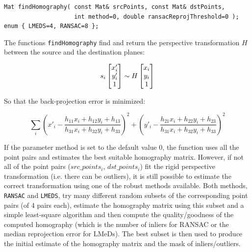 \begin{description}
\begin{lstlisting}
Mat findHomography( const Mat& srcPoints, const Mat& dstPoints,
                    int method=0, double ransacReprojThreshold=0 );
enum { LMEDS=4, RANSAC=8 };
\end{lstlisting}
\begin{description}
\end{description}

The functions \texttt{findHomography} find and return the perspective transformation $H$ between the source and the destination planes:

\[
s_i \begin{bmatrix} x'_i\\ y'_i\\ 1 \end{bmatrix} \sim H \begin{bmatrix} x_i\\ y_i\\ 1 \end{bmatrix}
\]

So that the back-projection error is minimized:

\[
\sum_i
\left( x'_i-\frac{h_{11} x_i + h_{12} y_i + h_{13}}{h_{31} x_i + h_{32} y_i + h_{33}} \right)^2+
\left( y'_i-\frac{h_{21} x_i + h_{22} y_i + h_{23}}{h_{31} x_i + h_{32} y_i + h_{33}} \right)^2
\]

If the parameter method is set to the default value 0, the function
uses all the point pairs and estimates the best suitable homography
matrix. However, if not all of the point pairs ($src\_points_i$,
$dst\_points_i$) fit the rigid perspective transformation (i.e. there
can be outliers), it is still possible to estimate the correct
transformation using one of the robust methods available. Both
methods, \texttt{RANSAC} and \texttt{LMEDS}, try many different random subsets
of the corresponding point pairs (of 4 pairs each), estimate
the homography matrix using this subset and a simple least-square
algorithm and then compute the quality/goodness of the computed homography
(which is the number of inliers for RANSAC or the median reprojection
error for LMeDs). The best subset is then used to produce the initial
estimate of the homography matrix and the mask of inliers/outliers.


\end{description}
